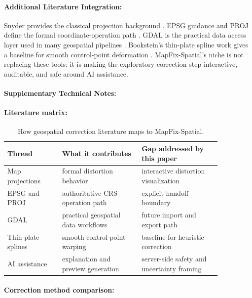 \documentclass{article}
\begin{document}
\paragraph{Additional Literature Integration:}

Snyder provides the classical projection background \citep{snyder1987map}. EPSG guidance and PROJ define the formal coordinate-operation path \citep{epsg72,proj}. GDAL is the practical data access layer used in many geospatial pipelines \citep{gdal}. Bookstein's thin-plate spline work gives a baseline for smooth control-point deformation \citep{bookstein1989principal}. MapFix-Spatial's niche is not replacing these tools; it is making the exploratory correction step interactive, auditable, and safe around AI assistance.

\paragraph{Supplementary Technical Notes:}

\paragraph{Literature matrix:}

\begin{table}[t]
\centering
\caption{How geospatial correction literature maps to MapFix-Spatial.}
\begin{tabular}{@{}p{0.22\linewidth}p{0.32\linewidth}p{0.32\linewidth}@{}}
\toprule
\textbf{Thread} & \textbf{What it contributes} & \textbf{Gap addressed by this paper}\\
\midrule
Map projections & formal distortion behavior & interactive distortion visualization\\
EPSG and PROJ & authoritative CRS operation path & explicit handoff boundary\\
GDAL & practical geospatial data workflows & future import and export path\\
Thin-plate splines & smooth control-point warping & baseline for heuristic correction\\
AI assistance & explanation and preview generation & server-side safety and uncertainty framing\\
\bottomrule
\end{tabular}
\end{table}

\paragraph{Correction method comparison:}
\end{document}

